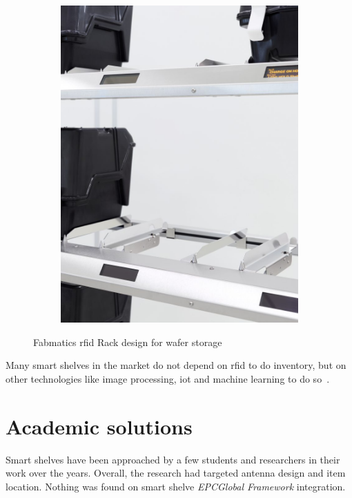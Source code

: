 \begin{figure}[!ht]
\begin{subfigure}{.45\textwidth}
        \includegraphics[width=\linewidth]{./figs/02-state-of-the-art/fabmaticsrfidrack3.jpg}
    \end{subfigure}
    \caption[Fabmatics \ac{rfid} Rack design for wafer storage]{Fabmatics \ac{rfid} Rack design for wafer storage~\cite{RFIDRackFabmatics}} 
    \label{fig:fabmaticsrfidrack}
\end{figure}

Many smart shelves in the market do not depend on \ac{rfid} to do inventory, but on other technologies like image processing, \ac{iot} and machine learning to do so~\cite{TechnologyWiseShelf, RetailSolutionsAWM}.

\section{Academic solutions}

Smart shelves have been approached by a few students and researchers in their work over the years. Overall, the research had targeted antenna design and item location. Nothing was found on smart shelve \emph{EPCGlobal Framework} integration.

